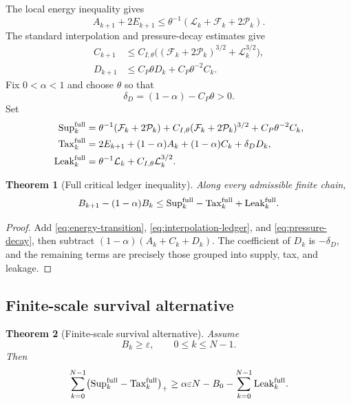 \documentclass[11pt]{article}
\numberwithin{equation}{section}
\newtheorem{theorem}{Theorem}[section]
\theoremstyle{remark}
\newcommand{\eps}{\varepsilon}
\newcommand{\Sup}{\mathrm{Sup}}
\newcommand{\Tax}{\mathrm{Tax}}
\newcommand{\Leak}{\mathrm{Leak}}
\newcommand{\calF}{\mathcal F}
\newcommand{\calL}{\mathcal L}
\newcommand{\calP}{\mathcal P}
\begin{document}
The local energy inequality gives
\begin{equation}\label{eq:energy-transition}
A_{k+1}+2E_{k+1}
\le \theta^{-1}(\calL_k+\calF_k+2\calP_k).
\end{equation}
The standard interpolation and pressure-decay estimates give
\begin{align}
C_{k+1}&\le C_{I,\theta}
\bigl((\calF_k+2\calP_k)^{3/2}+\calL_k^{3/2}\bigr),\label{eq:interpolation-ledger}\\
D_{k+1}&\le C_P\theta D_k+C_P\theta^{-2}C_k.\label{eq:pressure-decay}
\end{align}
Fix $0<\alpha<1$ and choose $\theta$ so that
\[
\delta_D=(1-\alpha)-C_P\theta>0.
\]
Set
\begin{align}
\Sup_k^{\rm full}
&=\theta^{-1}(\calF_k+2\calP_k)
+C_{I,\theta}(\calF_k+2\calP_k)^{3/2}
+C_P\theta^{-2}C_k,\\
\Tax_k^{\rm full}
&=2E_{k+1}+(1-\alpha)A_k+(1-\alpha)C_k+\delta_DD_k,\\
\Leak_k^{\rm full}
&=\theta^{-1}\calL_k+C_{I,\theta}\calL_k^{3/2}.
\end{align}

\begin{theorem}[Full critical ledger inequality]\label{thm:full-ledger}
Along every admissible finite chain,
\begin{equation}\label{eq:full-ledger}
B_{k+1}-(1-\alpha)B_k
\le
\Sup_k^{\rm full}-\Tax_k^{\rm full}+\Leak_k^{\rm full}.
\end{equation}
\end{theorem}

\begin{proof}
Add \eqref{eq:energy-transition}, \eqref{eq:interpolation-ledger}, and \eqref{eq:pressure-decay}, then subtract $(1-\alpha)(A_k+C_k+D_k)$. The coefficient of $D_k$ is $-\delta_D$, and the remaining terms are precisely those grouped into supply, tax, and leakage.
\end{proof}

\subsection{Finite-scale survival alternative}

\begin{theorem}[Finite-scale survival alternative]\label{thm:survival}
Assume
\[
B_k\ge\eps,
\qquad 0\le k\le N-1.
\]
Then
\begin{equation}\label{eq:survival}
\sum_{k=0}^{N-1}
\bigl(\Sup_k^{\rm full}-\Tax_k^{\rm full}\bigr)_+
\ge
\alpha\eps N-B_0-
\sum_{k=0}^{N-1}\Leak_k^{\rm full}.
\end{equation}
\end{theorem}
\end{document}
